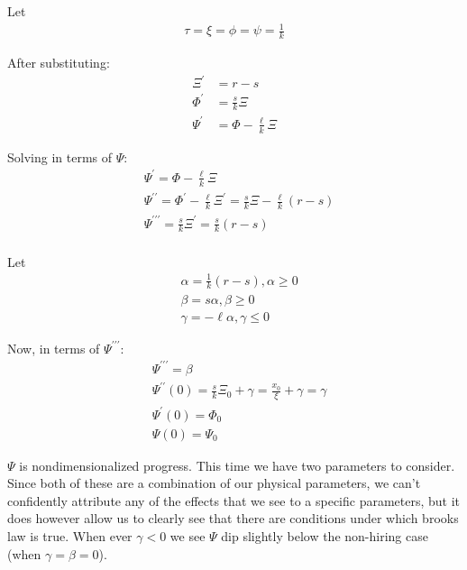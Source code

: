 \documentclass{article}
\newenvironment{atomize}
    {\begin{list} {} {
            \setlength\itemindent{0pt}
            \setlength\leftmargin{10pt}
            \setlength\labelwidth{0pt}
    }}
    {\end{list}}
\begin{document}
\begin{atomize}
\begin{atomize}
        \item Let
          \begin{align*}
            \tau = \xi = \phi = \psi = \frac{1}{k}
          \end{align*}
          
        \item After substituting:
          \begin{align*}
            \Xi^{\prime} &= r - s \\[6pt]
            \Phi^{\prime} &= \frac{s}{k}\Xi \\[6pt]
            \Psi^{\prime} &= \Phi - \frac{\ell}{k}\Xi
          \end{align*}

        \item Solving in terms of $\Psi$:
          \begin{align*}
            &\Psi^{\prime} = \Phi - \frac{\ell}{k}\Xi \\[6pt]
            &\Psi^{\prime\prime} = \Phi^{\prime} - \frac{\ell}{k}\Xi^{\prime} 
            = \frac{s}{k}\Xi - \frac{\ell}{k}(r - s) \\[6pt]
            &\Psi^{\prime\prime\prime} = \frac{s}{k}\Xi^{\prime} = 
            \frac{s}{k}(r - s) \\[6pt]
          \end{align*}

        \item Let
          \begin{align*}
            &\alpha = \frac{1}{k}(r-s), \alpha \geq 0 \\[6pt]
            &\beta = s\alpha, \beta \geq 0 \\[6pt]
            &\gamma = -\ell\alpha, \gamma \leq 0
          \end{align*}

        \item Now, in terms of $\Psi^{\prime\prime\prime}$:
          \begin{align*}
            &\Psi^{\prime\prime\prime} = \beta \\[6pt]
            &\Psi^{\prime\prime}(0) = \frac{s}{k}\Xi_{0} + \gamma = 
              \frac{x_{0}}{\xi} + \gamma = \gamma \\[6pt]
            &\Psi^{\prime}(0) = \Phi_{0} \\[6pt]
            &\Psi(0) = \Psi_{0}
          \end{align*}

        \item $\Psi$ is nondimensionalized progress. This time we have
        two parameters to consider. Since both of these are a combination of
        our physical parameters, we can't confidently attribute any of the 
        effects that we see to a specific parameters, but it does however 
        allow us to clearly see that there are conditions under which brooks 
        law is true. When ever $\gamma < 0$ we see $\Psi$ dip slightly below 
        the non-hiring case (when $\gamma = \beta = 0$).
        

\end{atomize}
\end{atomize}
\end{document}

